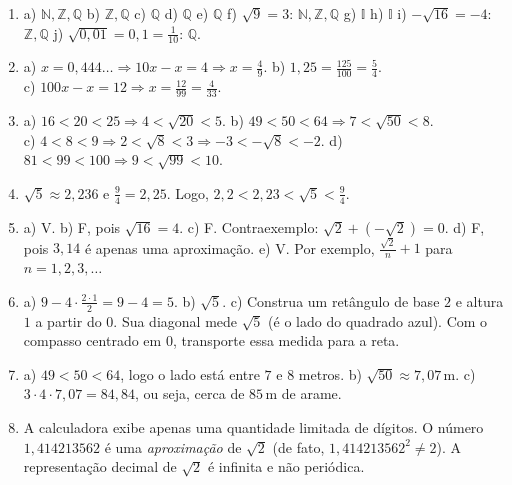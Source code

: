 \documentclass[11pt,a4paper]{article}
\begin{document}
\begin{enumerate}[label=\textbf{\arabic*.}]

  \item a) $\mathbb{N}, \mathbb{Z}, \mathbb{Q}$ \quad
        b) $\mathbb{Z}, \mathbb{Q}$ \quad
        c) $\mathbb{Q}$ \quad
        d) $\mathbb{Q}$ \quad
        e) $\mathbb{Q}$ \quad
        f) $\sqrt{9}=3$: $\mathbb{N}, \mathbb{Z}, \mathbb{Q}$ \quad
        g) $\mathbb{I}$ \quad
        h) $\mathbb{I}$ \quad
        i) $-\sqrt{16}=-4$: $\mathbb{Z}, \mathbb{Q}$ \quad
        j) $\sqrt{0{,}01} = 0{,}1 = \frac{1}{10}$: $\mathbb{Q}$.

  \item a) $x = 0{,}444\ldots \Rightarrow 10x - x = 4 \Rightarrow x = \frac{4}{9}$. \quad
        b) $1{,}25 = \frac{125}{100} = \frac{5}{4}$. \\
        c) $100x - x = 12 \Rightarrow x = \frac{12}{99} = \frac{4}{33}$.

  \item a) $16 < 20 < 25 \Rightarrow 4 < \sqrt{20} < 5$. \quad
        b) $49 < 50 < 64 \Rightarrow 7 < \sqrt{50} < 8$. \\
        c) $4 < 8 < 9 \Rightarrow 2 < \sqrt{8} < 3 \Rightarrow -3 < -\sqrt{8} < -2$. \quad
        d) $81 < 99 < 100 \Rightarrow 9 < \sqrt{99} < 10$.

  \item $\sqrt{5} \approx 2{,}236$ e $\frac{9}{4} = 2{,}25$. Logo,
        $2{,}2 < 2{,}23 < \sqrt{5} < \frac{9}{4}$.

  \item a) V. \quad
        b) F, pois $\sqrt{16} = 4$. \quad
        c) F. Contraexemplo: $\sqrt{2} + (-\sqrt{2}) = 0$. \quad
        d) F, pois $3{,}14$ é apenas uma aproximação. \quad
        e) V. Por exemplo, $\frac{\sqrt{2}}{n} + 1$ para $n = 1, 2, 3, \ldots$

  \item a) $9 - 4 \cdot \frac{2 \cdot 1}{2} = 9 - 4 = 5$. \quad
        b) $\sqrt{5}$. \quad
        c) Construa um retângulo de base $2$ e altura $1$ a partir do $0$.
        Sua diagonal mede $\sqrt{5}$ (é o lado do quadrado azul). Com o compasso
        centrado em $0$, transporte essa medida para a reta.

  \item a) $49 < 50 < 64$, logo o lado está entre $7$ e $8$ metros. \quad
        b) $\sqrt{50} \approx 7{,}07\,\text{m}$. \quad
        c) $3 \cdot 4 \cdot 7{,}07 = 84{,}84$, ou seja, cerca de $85\,\text{m}$ de arame.

  \item A calculadora exibe apenas uma quantidade limitada de dígitos. O número
        $1{,}414213562$ é uma \emph{aproximação} de $\sqrt{2}$ (de fato,
        $1{,}414213562^2 \neq 2$). A representação decimal de $\sqrt{2}$ é infinita e
        não periódica.

\end{enumerate}
\end{document}
